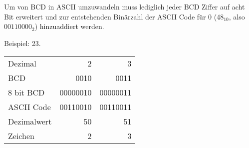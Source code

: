 \documentclass{CInf_practice}
\begin{document}
Um von BCD in ASCII umzuwandeln muss lediglich jeder BCD Ziffer auf acht Bit erweitert und zur entstehenden Binärzahl der ASCII Code für 0 ($48_{10}$, also $00110000_2$) hinzuaddiert werden.

Beispiel: 23.

\begin{center}
  \begin{tabular}{B|RR}
    Dezimal & 2 & 3 \\
    BCD     & 0010 & 0011 \\
    8 bit BCD & 00000010 & 00000011 \\
    ASCII Code & 00110010 & 00110011 \\
    Dezimalwert & 50 & 51 \\
    Zeichen & 2 & 3
  \end{tabular}
\end{center}
\end{document}
